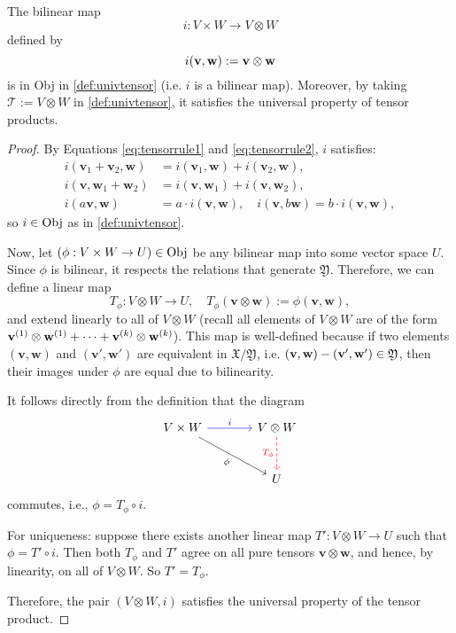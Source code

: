 \begin{theorem}\label{thm: univ-binlinear-map} 
The bilinear map
$$i : V \times W \rightarrow V \otimes W$$ 
defined by 
$$i({\bf v}, {\bf w}) := {\bf v} \otimes {\bf w}$$ 
is in \textnormal{Obj} in \autoref{def:univtensor} (i.e. $i$ is a bilinear map). Moreover, by taking $\mathcal{T} := V \otimes W$ in \autoref{def:univtensor}, it satisfies the universal property of tensor products.
\end{theorem}
\begin{proof}
By Equations \eqref{eq:tensorrule1} and \eqref{eq:tensorrule2}, \( i \) satisfies:
\begin{align*}
    i(\mathbf{v}_1 + \mathbf{v}_2, \mathbf{w}) &= i(\mathbf{v}_1, \mathbf{w}) + i(\mathbf{v}_2, \mathbf{w}), \\
    i(\mathbf{v}, \mathbf{w}_1 + \mathbf{w}_2) &= i(\mathbf{v}, \mathbf{w}_1) + i(\mathbf{v}, \mathbf{w}_2), \\
    i(a \mathbf{v}, \mathbf{w}) &= a \cdot i(\mathbf{v}, \mathbf{w}), \quad i(\mathbf{v}, b \mathbf{w}) = b \cdot i(\mathbf{v}, \mathbf{w}),
\end{align*}
so \( i \in \textnormal{Obj} \) as in \autoref{def:univtensor}.

Now, let \( (\phi : V \times W \to U) \in \textnormal{Obj} \) be any bilinear map into some vector space \( U \). Since \( \phi \) is bilinear, it respects the relations that generate \( \mathfrak{Y} \). Therefore, we can define a linear map
\[
T_{\phi} : V \otimes W \to U, \quad T_{\phi}(\mathbf{v} \otimes \mathbf{w}) := \phi(\mathbf{v}, \mathbf{w}),
\]
and extend linearly to all of \( V \otimes W \) (recall all elements of $V \otimes W$ are of the form ${\bf v}^{(1)} \otimes {\bf w}^{(1)} + \dots + {\bf v}^{(k)} \otimes {\bf w}^{(k)}$). This map is well-defined because if two elements \( (\mathbf{v}, \mathbf{w}) \) and \( (\mathbf{v}', \mathbf{w}') \) are equivalent in \( \mathfrak{X}/\mathfrak{Y} \), i.e. $({\bf v},{\bf w}) - ({\bf v}',{\bf w}') \in \mathfrak{Y}$, then their images under \( \phi \) are equal due to bilinearity.

It follows directly from the definition that the diagram
\[
\begin{tikzcd}[row sep=large, column sep=large]
V \times W \arrow[r, "i", blue] \arrow[rd, "\phi"'] & V \otimes W \arrow[d, "T_{\phi}"', dashed, red] \\
& U
\end{tikzcd}
\]
commutes, i.e., \( \phi = T_\phi \circ i \).

For uniqueness: suppose there exists another linear map \( T' : V \otimes W \to U \) such that \( \phi = T' \circ i \). Then both \( T_\phi \) and \( T' \) agree on all pure tensors \( \mathbf{v} \otimes \mathbf{w} \), and hence, by linearity, on all of \( V \otimes W \). So \( T' = T_\phi \).

Therefore, the pair \( (V \otimes W, i) \) satisfies the universal property of the tensor product.
\end{proof}

